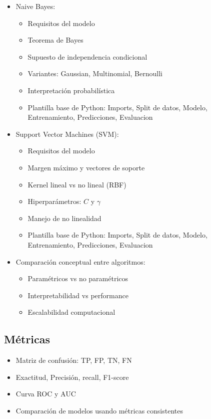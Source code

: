 \documentclass[12pt,a4paper,openany,oneside]{book}
\begin{document}
\begin{itemize}
\begin{itemize}
    \item Naive Bayes:
    \begin{itemize}
        \item Requisitos del modelo
        \item Teorema de Bayes
        \item Supuesto de independencia condicional
        \item Variantes: Gaussian, Multinomial, Bernoulli
        \item Interpretación probabilística
        \item Plantilla base de Python: Imports, Split de datos, Modelo, Entrenamiento, Predicciones, Evaluacion
    \end{itemize}
    
    \item Support Vector Machines (SVM):
    \begin{itemize}
        \item Requisitos del modelo
        \item Margen máximo y vectores de soporte
        \item Kernel lineal vs no lineal (RBF)
        \item Hiperparámetros: $C$ y $\gamma$
        \item Manejo de no linealidad
        \item Plantilla base de Python: Imports, Split de datos, Modelo, Entrenamiento, Predicciones, Evaluacion
    \end{itemize}
    
    \item Comparación conceptual entre algoritmos:
    \begin{itemize}
        \item Paramétricos vs no paramétricos
        \item Interpretabilidad vs performance
        \item Escalabilidad computacional
    \end{itemize}
\end{itemize}

\subsection{Métricas}
\begin{itemize}
    \item Matriz de confusión: TP, FP, TN, FN
    \item Exactitud, Precisión, recall, F1-score
    \item Curva ROC y AUC
    \item Comparación de modelos usando métricas consistentes
\end{itemize}


\end{itemize}
\end{document}
